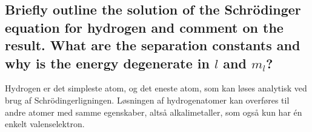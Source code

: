 \subsection{Briefly outline the solution of the Schrödinger equation for hydrogen and comment on the result. What are the separation constants and why is the energy degenerate in $l$ and $m_l$?}


Hydrogen er det simpleste atom, og det eneste atom, som kan løses analytisk ved brug af Schrödingerligningen. Løsningen af hydrogenatomer kan overføres til andre atomer med samme egenskaber, altså alkalimetaller, som også kun har én enkelt valenselektron.